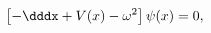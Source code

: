 \begin{equation} \label{wave-equation-repeated}
\left[ - \dddx + V(x) - \omega^2 \right] \psi(x) = 0,
\end{equation}

